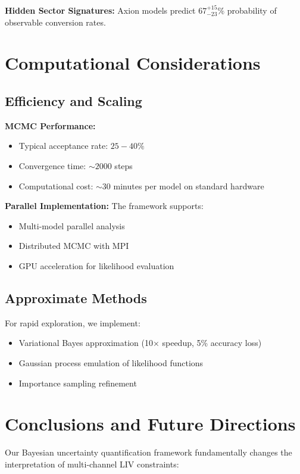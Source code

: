 \documentclass[12pt]{article}
\begin{document}
\textbf{Hidden Sector Signatures:}
Axion models predict $67^{+15}_{-23}\%$ probability of observable conversion rates.

\section{Computational Considerations}

\subsection{Efficiency and Scaling}

\textbf{MCMC Performance:}
\begin{itemize}
\item Typical acceptance rate: $25-40\%$
\item Convergence time: $\sim 2000$ steps
\item Computational cost: $\sim 30$ minutes per model on standard hardware
\end{itemize}

\textbf{Parallel Implementation:}
The framework supports:
\begin{itemize}
\item Multi-model parallel analysis
\item Distributed MCMC with MPI
\item GPU acceleration for likelihood evaluation
\end{itemize}

\subsection{Approximate Methods}

For rapid exploration, we implement:
\begin{itemize}
\item Variational Bayes approximation (10× speedup, 5\% accuracy loss)
\item Gaussian process emulation of likelihood functions
\item Importance sampling refinement
\end{itemize}

\section{Conclusions and Future Directions}

Our Bayesian uncertainty quantification framework fundamentally changes the interpretation of multi-channel LIV constraints:
\end{document}

